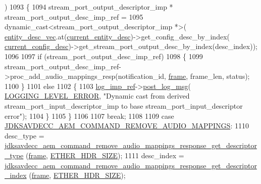 \begin{DoxyCode}
{{      )
1093         \{
1094             stream\_port\_output\_descriptor\_imp * stream\_port\_output\_desc\_imp\_ref =
1095                 \textcolor{keyword}{dynamic\_cast<}stream\_port\_output\_descriptor\_imp *\textcolor{keyword}{>}(
      \hyperlink{classavdecc__lib_1_1end__station__imp_a72edab41bc56e3c1757944a7df188a3d}{entity\_desc\_vec}.at(\hyperlink{classavdecc__lib_1_1end__station__imp_afd78c89df26ba7641e1adb764c0e827d}{current\_entity\_desc})->get\_config\_desc\_by\_index(
      \hyperlink{classavdecc__lib_1_1end__station__imp_a60b1af40d35e8a86b0082c54ab6cb6a8}{current\_config\_desc})->get\_stream\_port\_output\_desc\_by\_index(desc\_index));
1096 
1097             \textcolor{keywordflow}{if} (stream\_port\_output\_desc\_imp\_ref)
1098             \{
1099                 stream\_port\_output\_desc\_imp\_ref->proc\_add\_audio\_mappings\_resp(notification\_id, 
      \hyperlink{gst__avb__playbin_8c_ac8e710e0b5e994c0545d75d69868c6f0}{frame}, frame\_len, status);
1100             \}
1101             \textcolor{keywordflow}{else}
1102             \{
1103                 \hyperlink{namespaceavdecc__lib_acbe3e2a96ae6524943ca532c87a28529}{log\_imp\_ref}->\hyperlink{classavdecc__lib_1_1log_a68139a6297697e4ccebf36ccfd02e44a}{post\_log\_msg}(
      \hyperlink{namespaceavdecc__lib_a501055c431e6872ef46f252ad13f85cdaf2c4481208273451a6f5c7bb9770ec8a}{LOGGING\_LEVEL\_ERROR}, \textcolor{stringliteral}{"Dynamic cast from derived stream\_port\_input\_descriptor\_imp to base
       stream\_port\_input\_descriptor error"});
1104             \}
1105         \}
1106 
1107         \textcolor{keywordflow}{break};
1108 
1109     \textcolor{keywordflow}{case} \hyperlink{group__command_gae6ee643ac7127012a5a4cc44813f52c7}{JDKSAVDECC\_AEM\_COMMAND\_REMOVE\_AUDIO\_MAPPINGS}:
1110         desc\_type = 
      \hyperlink{group__command__remove__audio__mappings__response_gaaf6fad9510ca65f16d280fb55dbdeb14}{jdksavdecc\_aem\_command\_remove\_audio\_mappings\_response\_get\_descriptor\_type}
      (\hyperlink{gst__avb__playbin_8c_ac8e710e0b5e994c0545d75d69868c6f0}{frame}, \hyperlink{namespaceavdecc__lib_a6c827b1a0d973e18119c5e3da518e65ca9512ad9b34302ba7048d88197e0a2dc0}{ETHER\_HDR\_SIZE});
1111         desc\_index = 
      \hyperlink{group__command__remove__audio__mappings__response_gaaee6006c666f0e70019f55bd95d5d2cf}{jdksavdecc\_aem\_command\_remove\_audio\_mappings\_response\_get\_descriptor\_index}
      (\hyperlink{gst__avb__playbin_8c_ac8e710e0b5e994c0545d75d69868c6f0}{frame}, \hyperlink{namespaceavdecc__lib_a6c827b1a0d973e18119c5e3da518e65ca9512ad9b34302ba7048d88197e0a2dc0}{ETHER\_HDR\_SIZE});
}}
\end{DoxyCode}
